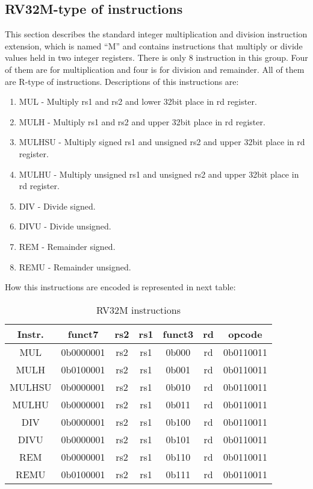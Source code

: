 \documentclass{scrreprt}
\begin{document}
\newpage
\subsection*{RV32M-type of instructions}
This section describes the standard integer multiplication and division instruction extension, which
is named “M” and contains instructions that multiply or divide values held in two integer registers.
There is only 8 instruction in this group. Four of them are for multiplication and four is for division and remainder. All of them are R-type of instructions. 
\hfill \break
Descriptions of this instructions are:
\begin{enumerate}
        \item MUL - Multiply rs1 and rs2 and lower 32bit place in rd register.  
        \item MULH - Multiply rs1 and rs2 and upper 32bit place in rd register. 
        \item MULHSU - Multiply signed rs1 and unsigned rs2 and upper 32bit place in rd register. 
        \item MULHU - Multiply unsigned rs1 and unsigned rs2 and upper 32bit place in rd register.
        \item DIV - Divide signed. 
        \item DIVU - Divide unsigned. 
        \item REM - Remainder signed. 
        \item REMU - Remainder unsigned. 
\end{enumerate}

How this instructions are encoded is represented in next table:
\begin{table}[htb!]
        \centering
        \begin{tabular}{|c|c|c|c|c|c|c|} \hline 
             Instr. & funct7 & rs2 & rs1 & funct3 & rd & opcode\\ \hline 
             MUL & 0b0000001 & rs2 & rs1 & 0b000 & rd & 0b0110011\\ \hline 
             MULH & 0b0100001 & rs2 & rs1 & 0b001 & rd & 0b0110011\\ \hline 
             MULHSU & 0b0000001 & rs2 & rs1 & 0b010 & rd & 0b0110011\\ \hline 
             MULHU & 0b0000001 & rs2 & rs1 & 0b011 & rd & 0b0110011\\ \hline 
             DIV & 0b0000001 & rs2 & rs1 & 0b100 & rd & 0b0110011\\ \hline 
             DIVU & 0b0000001 & rs2 & rs1 & 0b101 & rd & 0b0110011\\ \hline 
             REM & 0b0000001 & rs2 & rs1 & 0b110 & rd & 0b0110011\\ \hline 
             REMU & 0b0100001 & rs2 & rs1 & 0b111 & rd & 0b0110011 \\ \hline  
        \end{tabular}
        \caption{RV32M instructions}
        \label{tab:tableRV32M}
    \end{table}
\end{document}
